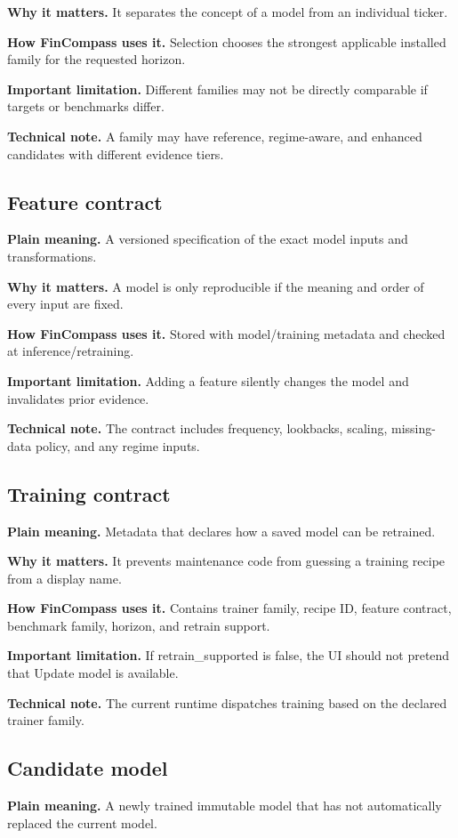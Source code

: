 \documentclass[11pt]{article}
\begin{document}
\textbf{Why it matters.} It separates the concept of a model from an individual ticker.

\textbf{How FinCompass uses it.} Selection chooses the strongest applicable installed family for the requested horizon.

\textbf{Important limitation.} Different families may not be directly comparable if targets or benchmarks differ.

\textbf{Technical note.} A family may have reference, regime-aware, and enhanced candidates with different evidence tiers.

\subsection{Feature contract}
\textbf{Plain meaning.} A versioned specification of the exact model inputs and transformations.

\textbf{Why it matters.} A model is only reproducible if the meaning and order of every input are fixed.

\textbf{How FinCompass uses it.} Stored with model/training metadata and checked at inference/retraining.

\textbf{Important limitation.} Adding a feature silently changes the model and invalidates prior evidence.

\textbf{Technical note.} The contract includes frequency, lookbacks, scaling, missing-data policy, and any regime inputs.

\subsection{Training contract}
\textbf{Plain meaning.} Metadata that declares how a saved model can be retrained.

\textbf{Why it matters.} It prevents maintenance code from guessing a training recipe from a display name.

\textbf{How FinCompass uses it.} Contains trainer family, recipe ID, feature contract, benchmark family, horizon, and retrain support.

\textbf{Important limitation.} If retrain\_supported is false, the UI should not pretend that Update model is available.

\textbf{Technical note.} The current runtime dispatches training based on the declared trainer family.

\subsection{Candidate model}
\textbf{Plain meaning.} A newly trained immutable model that has not automatically replaced the current model.
\end{document}
